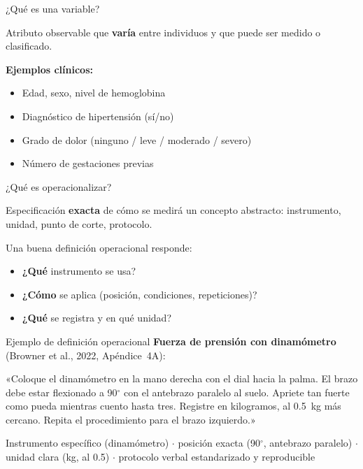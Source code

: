 \documentclass[aspectratio=169, 12pt, xcolor=table]{beamer}
\begin{document}
\begin{frame}{¿Qué es una variable?}
  \begin{definicion}[Variable]
    Atributo observable que \textbf{varía} entre individuos y que
    puede ser medido o clasificado.
  \end{definicion}

  \vspace{8pt}
  \textbf{Ejemplos clínicos:}
  \begin{itemize}
    \item Edad, sexo, nivel de hemoglobina
    \item Diagnóstico de hipertensión (sí/no)
    \item Grado de dolor (ninguno / leve / moderado / severo)
    \item Número de gestaciones previas
  \end{itemize}
\end{frame}

\begin{frame}{¿Qué es operacionalizar?}
  \begin{definicion}
    Especificación \textbf{exacta} de cómo se medirá un concepto abstracto:
    instrumento, unidad, punto de corte, protocolo.
  \end{definicion}

  \vspace{8pt}
  Una buena definición operacional responde:
  \begin{itemize}
    \item \textbf{¿Qué} instrumento se usa?
    \item \textbf{¿Cómo} se aplica (posición, condiciones, repeticiones)?
    \item \textbf{¿Qué} se registra y en qué unidad?
  \end{itemize}
\end{frame}

\begin{frame}{Ejemplo de definición operacional}
  \textbf{Fuerza de prensión con dinamómetro} (Browner et al., 2022, Apéndice~4A):

  \vspace{6pt}
  \begin{nota}
    «Coloque el dinamómetro en la mano derecha con el dial hacia la palma.
    El brazo debe estar flexionado a 90$^{\circ}$ con el antebrazo paralelo al suelo.
    Apriete tan fuerte como pueda mientras cuento hasta tres.
    Registre en kilogramos, al 0.5~kg más cercano.
    Repita el procedimiento para el brazo izquierdo.»
  \end{nota}

  \vspace{6pt}
  \begin{definicion}
    Instrumento específico (dinamómetro) $\cdot$
    posición exacta (90$^{\circ}$, antebrazo paralelo) $\cdot$
    unidad clara (kg, al 0.5) $\cdot$
    protocolo verbal estandarizado y reproducible
  \end{definicion}
\end{frame}
\end{document}
